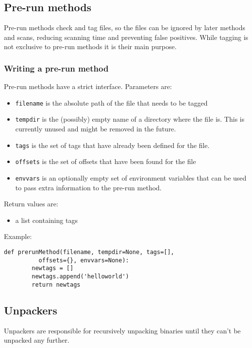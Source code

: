 \documentclass[10pt]{article}
\begin{document}
\subsection{Pre-run methods}

Pre-run methods check and tag files, so the files can be ignored by later
methods and scans, reducing scanning time and preventing false positives. While
tagging is not exclusive to pre-run methods it is their main purpose.

\subsubsection{Writing a pre-run method}

Pre-run methods have a strict interface. Parameters are:

\begin{itemize}
\item \texttt{filename} is the absolute path of the file that needs to be tagged
\item \texttt{tempdir} is the (possibly) empty name of a directory where the
file is. This is currently unused and might be removed in the future.
\item \texttt{tags} is the set of tags that have already been defined for the
file.
\item \texttt{offsets} is the set of offsets that have been found for the file
\item \texttt{envvars} is an optionally empty set of environment variables that
can be used to pass extra information to the pre-run method.
\end{itemize}

Return values are:

\begin{itemize}
\item a list containing tags
\end{itemize}

Example:

\begin{verbatim}
def prerunMethod(filename, tempdir=None, tags=[],
          offsets={}, envvars=None):
        newtags = []
        newtags.append('helloworld')
        return newtags
\end{verbatim}

\subsection{Unpackers}

Unpackers are responsible for recursively unpacking binaries until they
can't be unpacked any further.
\end{document}
